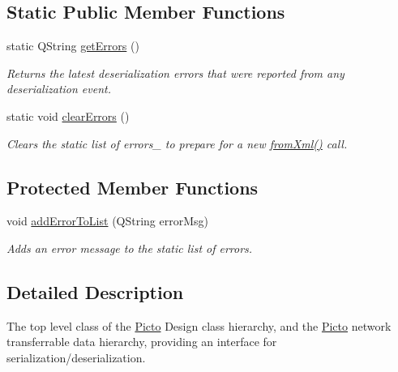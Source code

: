 \subsection*{Static Public Member Functions}
\begin{DoxyCompactItemize}
\item 
static Q\-String \hyperlink{class_picto_1_1_serializable_a9b14c771646820d10e082d351cd4cf50}{get\-Errors} ()
\begin{DoxyCompactList}\small\item\em Returns the latest deserialization errors that were reported from any deserialization event. \end{DoxyCompactList}\item 
\hypertarget{class_picto_1_1_serializable_a6c5644865540a1e1e8951895c836b5cf}{static void \hyperlink{class_picto_1_1_serializable_a6c5644865540a1e1e8951895c836b5cf}{clear\-Errors} ()}\label{class_picto_1_1_serializable_a6c5644865540a1e1e8951895c836b5cf}

\begin{DoxyCompactList}\small\item\em Clears the static list of errors\-\_\- to prepare for a new \hyperlink{class_picto_1_1_serializable_acbaf02a158b3440a16bc1a84ebaa4481}{from\-Xml()} call. \end{DoxyCompactList}\end{DoxyCompactItemize}
\subsection*{Protected Member Functions}
\begin{DoxyCompactItemize}
\item 
void \hyperlink{class_picto_1_1_serializable_a96d216d572c87de0e7b2ba4ae1c6ea17}{add\-Error\-To\-List} (Q\-String error\-Msg)
\begin{DoxyCompactList}\small\item\em Adds an error message to the static list of errors. \end{DoxyCompactList}\end{DoxyCompactItemize}


\subsection{Detailed Description}
The top level class of the \hyperlink{namespace_picto}{Picto} Design class hierarchy, and the \hyperlink{namespace_picto}{Picto} network transferrable data hierarchy, providing an interface for serialization/deserialization. 

